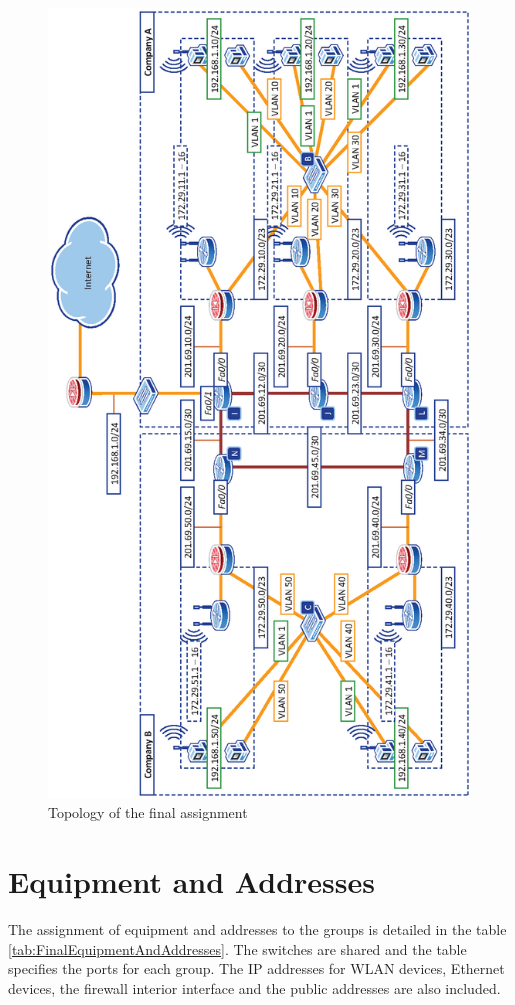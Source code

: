 \begin{figure}
\includegraphics[width=0.9\linewidth]{Figures/Final.eps}
\fi
\caption{Topology of the final assignment}
\label{fig:Final}
\end{figure}

\section{Equipment and Addresses}

The assignment of equipment and addresses to the groups is detailed in the table \ref{tab:FinalEquipmentAndAddresses}. The switches are shared and the table specifies the ports for each group. The IP addresses for WLAN devices, Ethernet devices, the firewall interior interface and the public addresses are also included.

